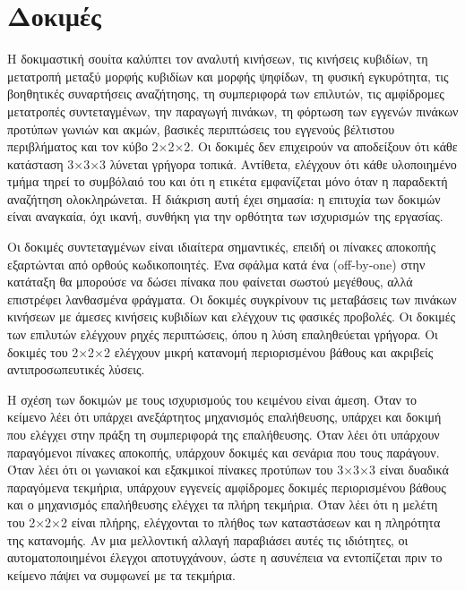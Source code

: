 \section{Δοκιμές}
\label{sec:implementation-tests}
Η δοκιμαστική σουίτα καλύπτει τον αναλυτή κινήσεων, τις κινήσεις κυβιδίων, τη μετατροπή μεταξύ μορφής κυβιδίων και μορφής ψηφίδων, τη φυσική εγκυρότητα, τις βοηθητικές συναρτήσεις αναζήτησης, τη συμπεριφορά των επιλυτών, τις αμφίδρομες μετατροπές συντεταγμένων, την παραγωγή πινάκων, τη φόρτωση των εγγενών πινάκων προτύπων γωνιών και ακμών, βασικές περιπτώσεις του εγγενούς βέλτιστου περιβλήματος και τον κύβο 2×2×2. Οι δοκιμές δεν επιχειρούν να αποδείξουν ότι κάθε κατάσταση 3×3×3 λύνεται γρήγορα τοπικά. Αντίθετα, ελέγχουν ότι κάθε υλοποιημένο τμήμα τηρεί το συμβόλαιό του και ότι η ετικέτα  εμφανίζεται μόνο όταν η παραδεκτή αναζήτηση ολοκληρώνεται. Η διάκριση αυτή έχει σημασία: η επιτυχία των δοκιμών είναι αναγκαία, όχι ικανή, συνθήκη για την ορθότητα των ισχυρισμών της εργασίας.

Οι δοκιμές συντεταγμένων είναι ιδιαίτερα σημαντικές, επειδή οι πίνακες αποκοπής εξαρτώνται από ορθούς κωδικοποιητές. Ένα σφάλμα κατά ένα (off-by-one) στην κατάταξη θα μπορούσε να δώσει πίνακα που φαίνεται σωστού μεγέθους, αλλά επιστρέφει λανθασμένα φράγματα. Οι δοκιμές συγκρίνουν τις μεταβάσεις των πινάκων κινήσεων με άμεσες κινήσεις κυβιδίων και ελέγχουν τις φασικές προβολές. Οι δοκιμές των επιλυτών ελέγχουν ρηχές περιπτώσεις, όπου η λύση επαληθεύεται γρήγορα. Οι δοκιμές του 2×2×2 ελέγχουν μικρή κατανομή περιορισμένου βάθους και ακριβείς αντιπροσωπευτικές λύσεις.

Η σχέση των δοκιμών με τους ισχυρισμούς του κειμένου είναι άμεση. Όταν το κείμενο λέει ότι υπάρχει ανεξάρτητος μηχανισμός επαλήθευσης, υπάρχει και δοκιμή που ελέγχει στην πράξη τη συμπεριφορά της επαλήθευσης. Όταν λέει ότι υπάρχουν παραγόμενοι πίνακες αποκοπής, υπάρχουν δοκιμές και σενάρια που τους παράγουν. Όταν λέει ότι οι γωνιακοί και εξακμικοί πίνακες προτύπων του 3×3×3 είναι δυαδικά παραγόμενα τεκμήρια, υπάρχουν εγγενείς αμφίδρομες δοκιμές περιορισμένου βάθους και ο μηχανισμός επαλήθευσης ελέγχει τα πλήρη τεκμήρια. Όταν λέει ότι η μελέτη του 2×2×2 είναι πλήρης, ελέγχονται το πλήθος των καταστάσεων και η πληρότητα της κατανομής. Αν μια μελλοντική αλλαγή παραβιάσει αυτές τις ιδιότητες, οι αυτοματοποιημένοι έλεγχοι αποτυγχάνουν, ώστε η ασυνέπεια να εντοπίζεται πριν το κείμενο πάψει να συμφωνεί με τα τεκμήρια.
